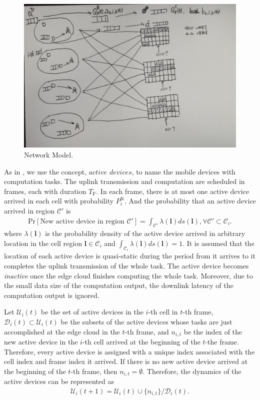 \documentclass[12pt, draftclsnofoot, onecolumn]{IEEEtran}
\begin{document}
\begin{figure}[tb]
	\centering
	\includegraphics[scale = 0.1]{fig/scenario.jpg}
	\caption{Network Model.}
	\label{fig:scenario}
\end{figure}

As in \cite{}, we use the concept, $\textit{active devices}$, to name the mobile devices with computation tasks. The uplink transmission and computation are scheduled in frames, each with duration $T_{\mathrm{F}}$. In each frame, there is at most one active device arrived in each cell with probability $P_{i}^{\mathrm{N}}$. And the probability that an active device arrived in region $\mathcal{C}'$ is
\begin{align}
	\mathrm{Pr}[\text{New active device in region }\mathcal{C}']=\int_{\mathcal{C}'}\lambda(\mathbf{l})ds(\mathbf{l}),\forall \mathcal{C}'\subset\mathcal{C}_{i}.
\end{align}
where $\lambda(\mathbf{l})$ is the probability density of the active device arrived in arbitrary location in the cell region $\mathbf{l}\in\mathcal{C}_{i}$ and $\int_{\mathcal{C}_{i}}\lambda(\mathbf{l})ds(\mathbf{l})=1$. It is assumed that the location of each active device is quasi-static during the period from it arrives to it completes the uplink transmission of the whole task. The active device becomes \textit{inactive} once the edge cloud finishes computing the whole task. Moreover, due to the small data size of the computation output, the downlink latency of the computation output is ignored.

Let $\mathcal{U}_{i}(t)$ be the set of active devices in the $i$-th cell in $t$-th frame, $\mathcal{D}_{i}(t)\subset\mathcal{U}_{i}(t)$ be the subsets of the active devices whose tasks are just accomplished at the edge cloud in the $t$-th frame, and $n_{i,t}$ be the index of the new active device in the $i$-th cell arrived at the beginning of the $t$-the frame. Therefore, every active device is assigned with a unique index associated with the cell index and frame index it arrived. If there is no new active device arrived at the beginning of the $t$-th frame, then $n_{i,t}=\emptyset$. Therefore, the dynamics of the active devices can be represented as
\begin{align}
	\mathcal{U}_{i}(t+1)= \mathcal{U}_{i}(t)\cup\{n_{i,t}\}/\mathcal{D}_{i}(t).
\end{align}
\end{document}
